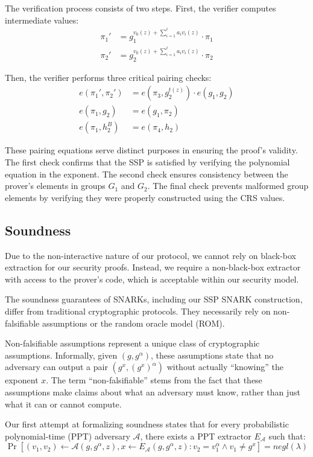 The verification process consists of two steps. First, the verifier computes intermediate values:
\begin{align*}
    \pi_1' &= g_1^{v_0(z) + \sum_{i=1}^\ell a_i v_i(z)} \cdot \pi_1 \\
    \pi_2' &= g_2^{v_0(z) + \sum_{i=1}^\ell a_i v_i(z)} \cdot \pi_2
\end{align*}

Then, the verifier performs three critical pairing checks:
\begin{align*}
    e(\pi_1', \pi_2') &= e(\pi_3, g_2^{t(z)}) \cdot e(g_1, g_2) \\
    e(\pi_1, g_2) &= e(g_1, \pi_2) \\
    e(\pi_1, h_2^B) &= e(\pi_4, h_2)
\end{align*}

These pairing equations serve distinct purposes in ensuring the proof's validity. The first check confirms that the SSP is satisfied by verifying the polynomial equation in the exponent. The second check ensures consistency between the prover's elements in groups $G_1$ and $G_2$. The final check prevents malformed group elements by verifying they were properly constructed using the CRS values.

\subsection{Soundness}

Due to the non-interactive nature of our protocol, we cannot rely on black-box extraction for our security proofs. Instead, we require a non-black-box extractor with access to the prover's code, which is acceptable within our security model.

The soundness guarantees of SNARKs, including our SSP SNARK construction, differ from traditional cryptographic protocols. They necessarily rely on non-falsifiable assumptions or the random oracle model (ROM).

Non-falsifiable assumptions represent a unique class of cryptographic assumptions. Informally, given $(g, g^\alpha)$, these assumptions state that no adversary can output a pair $(g^x, (g^x)^\alpha)$ without actually ``knowing'' the exponent $x$. The term ``non-falsifiable'' stems from the fact that these assumptions make claims about what an adversary must know, rather than just what it can or cannot compute.

Our first attempt at formalizing soundness states that for every probabilistic polynomial-time (PPT) adversary $\mathcal{A}$, there exists a PPT extractor $E_\mathcal{A}$ such that:
\[ \Pr[(v_1, v_2) \gets \mathcal{A}(g, g^\alpha, z), x \gets E_\mathcal{A}(g, g^\alpha, z) : v_2 = v_1^\alpha \land v_1 \neq g^x] = negl(\lambda) \]

